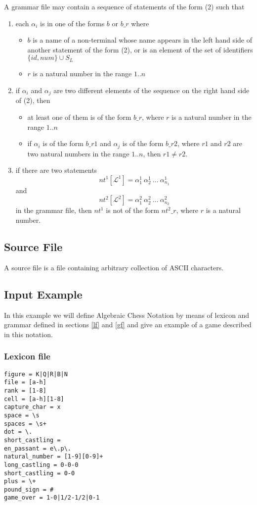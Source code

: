 \documentclass[a4paper,10pt]{article}
\begin{document}
A grammar file may contain a sequence of statements of the form (2) such that
\begin{enumerate}
\item each $\alpha_i$ is in one of the forms $b$ or $b\_r$ where 
\begin{itemize}
\item $b$ is a name of a non-terminal whose name appears in the left hand side of another statement of the form (2), or is an element of the set of identifiers $\{id,num\}\cup S_L$
\item $r$ is a natural number in the range $1..n$
\end{itemize}
\item if $\alpha_i$ and $\alpha_j$ are two different elements of the sequence on the right hand side of (2), then 
\begin{itemize}
\item at least one of them is of the form $b\_r$, where $r$ is a natural number in the range $1..n$
\item if $\alpha_i$ is of the form $b\_{r1}$ and $\alpha_j$ is of the form $b\_{r2}$, where $r1$ and $r2$ are two natural numbers in the range $1..n$, then $r1 \not= r2$.
\end{itemize} 
\item if there are two statements 
$$ nt^1[\mathcal{L^1}] = \alpha_1^1~\alpha_2^1~\ldots~\alpha_{n_1}^1  $$
and
$$ nt^2[\mathcal{L^2}] = \alpha_1^2~\alpha_2^2~\ldots~\alpha_{n_2}^2  $$
in the grammar file, then $nt^1$ is not of the form $nt^2\_r$, where $r$ is a natural number.
\end{enumerate}
 




\subsection{Source File}\label{sf}
A source file is a file containing arbitrary collection of ASCII characters.

\subsection{Input Example}\label{ie} 
In this example we will define Algebraic Chess Notation \cite{chess} by means of lexicon and grammar defined in sections \ref{lf} and \ref{gf} and give an example of a game described in this notation. 
\subsubsection{Lexicon file}
\begin{verbatim}
figure = K|Q|R|B|N
file = [a-h]
rank = [1-8]
cell = [a-h][1-8]
capture_char = x
space = \s
spaces = \s+
dot = \.
short_castling = 
en_passant = e\.p\.
natural_number = [1-9][0-9]+
long_castling = 0-0-0
short_castling = 0-0
plus = \+
pound_sign = #
game_over = 1-0|1/2-1/2|0-1
\end{verbatim}
\end{document}
